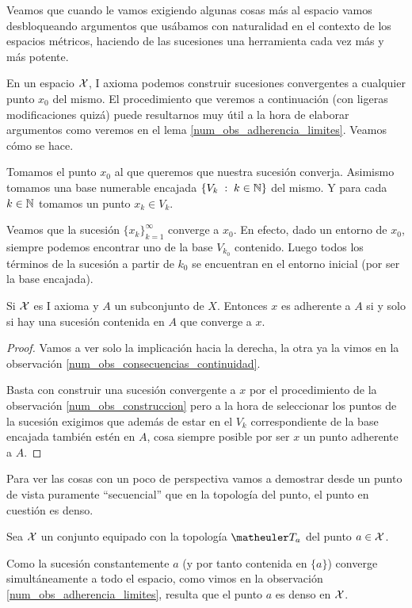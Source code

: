 Veamos que cuando le vamos exigiendo algunas cosas más al espacio vamos desbloqueando argumentos que usábamos con naturalidad en el contexto de los espacios métricos, haciendo de las sucesiones una herramienta cada vez más y más potente.
\begin{obs}
	\label{num_obs_construccion}
	En un espacio $\mathcal{X}$, I axioma podemos construir sucesiones convergentes a cualquier punto $x_0$ del mismo. El procedimiento que veremos a continuación (con ligeras modificaciones quizá) puede resultarnos muy útil a la hora de elaborar argumentos como veremos en el lema \ref{num_obs_adherencia_limites}. Veamos cómo se hace.
	
	Tomamos el punto $x_0$ al que queremos que nuestra sucesión converja. Asimismo tomamos una base numerable encajada $\{V_k\;:\; k\in\mathbb{N}\}$ del mismo. Y para cada $k\in\mathbb{N}$ tomamos un punto $x_k\in V_k$.
	
	Veamos que la sucesión $\{x_k\}_{k=1}^{\infty}$ converge a $x_0$. En efecto, dado un entorno de $x_0$, siempre podemos encontrar uno de la base $V_{k_0}$ contenido. Luego todos los términos de la sucesión a partir de $k_0$ se encuentran en el entorno inicial (por ser la base encajada).
\end{obs}
\begin{lem}
	\label{num_obs_adherencia_limites}	
	Si $\mathcal{X}$ es I axioma y $A$ un subconjunto de $X$. Entonces $x$ es adherente a $A$ si y solo si hay una sucesión contenida en $A$ que converge a $x$.
\end{lem}
\begin{proof}
	Vamos a ver solo la implicación hacia la derecha, la otra ya la vimos en la observación \ref{num_obs_consecuencias_continuidad}.
	
	Basta con construir una sucesión convergente a $x$ por el procedimiento de la observación \ref{num_obs_construccion} pero a la hora de seleccionar los puntos de la sucesión exigimos que además de estar en el $V_k$ correspondiente de la base encajada también estén en $A$, cosa siempre posible por ser $x$ un punto adherente a $A$.
\end{proof}

Para ver las cosas con un poco de perspectiva vamos a demostrar desde un punto de vista puramente ``secuencial'' que en la topología del punto, el punto en cuestión es denso.
\begin{exa}
	\label{num_exa_adher_topologia_punto}
	Sea $\mathcal{X}$ un conjunto equipado con la topología $\T_a$ del punto $a\in\mathcal{X}$.
	
	Como la sucesión constantemente $a$ (y por tanto contenida en $\{a\}$) converge simultáneamente a todo el espacio, como vimos en la observación \ref{num_obs_adherencia_limites}, resulta que el punto $a$ es denso en $\mathcal{X}$.
\end{exa}

